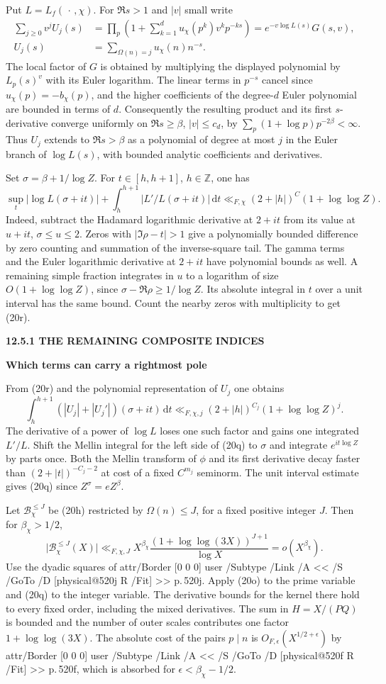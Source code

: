 \documentclass[11pt,letterpaper]{article}
\makeatletter
\newcommand{\rightmarktext}{}
\newcommand{\printfolio}{}
\newcommand{\leaf}[4]{\clearpage\gdef\printfolio{#1}\gdef\rightmarktext{#2}%
  {\small\sffamily\bfseries\color{ink}#3\par}\vspace{3pt}%
  {\LARGE\bfseries #4\par}\vspace{5pt}}
\newcommand{\Z}{\mathbb Z}
\newcommand{\dd}{\,\mathrm d}
\newcommand{\MusicPDFPageRef}[1]{\pdfpageref\csname physical@#1\endcsname\space\space 0 R}
\newcommand{\pagelink}[2]{\leavevmode\pdfstartlink attr{/Border [0 0 0]} user{%
  /Subtype /Link /A << /S /GoTo /D [\MusicPDFPageRef{#1} /Fit] >>}%
  {\color{ink}#2}\pdfendlink}
\newcommand{\pg}[1]{\pagelink{#1}{p.\,#1}}
\makeatother
\begin{document}
Put $L=L_f(\,\cdot\,,\chi)$. For $\Re s>1$ and $|v|$ small write
\[
 \begin{split}
  \sum_{j\ge0}v^j U_j(s)
   &=\prod_p\left(1+\sum_{k=1}^d u_\chi(p^k)v^k p^{-ks}\right)
     =e^{-v\log L(s)}G(s,v),\\
  U_j(s)&=\sum_{\Omega(n)=j} u_\chi(n)n^{-s}.
 \end{split}
\]
The local factor of $G$ is obtained by multiplying the displayed
polynomial by $L_p(s)^v$ with its Euler logarithm. The linear terms in
$p^{-s}$ cancel since $u_\chi(p)=-b_\chi(p)$, and the higher coefficients
of the degree-$d$ Euler polynomial are bounded in terms of $d$.
Consequently the resulting product and its first $s$-derivative converge
uniformly on $\Re s\ge\beta$, $|v|\le c_d$, by
$\sum_p(1+\log p)p^{-2\beta}<\infty$. Thus $U_j$ extends to
$\Re s>\beta$ as a polynomial of degree at most $j$ in the Euler branch
of $\log L(s)$, with bounded analytic coefficients and derivatives.

Set $\sigma=\beta+1/\log Z$. For $t\in[h,h+1]$, $h\in\Z$, one has
\[
 \sup_t|\log L(\sigma+it)|
  +\int_h^{h+1}|L'/L(\sigma+it)|\dd t
       \ll_{F,\chi}(2+|h|)^C(1+\log\log Z).
 \tag{20r}
\]
Indeed, subtract the Hadamard logarithmic derivative at $2+it$ from
its value at $u+it$, $\sigma\le u\le2$. Zeros with
$|\Im\rho-t|>1$ give a polynomially bounded difference by zero
counting and summation of the inverse-square tail. The gamma terms
and the Euler logarithmic derivative at $2+it$ have polynomial bounds
as well. A remaining simple fraction integrates in $u$ to a logarithm
of size $O(1+\log\log Z)$, since $\sigma-\Re\rho\ge1/\log Z$.
Its absolute integral in $t$ over a unit interval has the same bound.
Count the nearby zeros with multiplicity to get (20r).

\leaf{520m}{A fixed number of prime factors}{12.5.1 \quad THE REMAINING COMPOSITE INDICES}{Which terms can carry a rightmost pole}
From (20r) and the polynomial representation of $U_j$ one obtains
\[
  \int_h^{h+1}(|U_j|+|U_j'|)(\sigma+it)\dd t
       \ll_{F,\chi,j}(2+|h|)^{C_j}(1+\log\log Z)^j .
\]
The derivative of a power of $\log L$ loses one such factor and gains
one integrated $L'/L$. Shift the Mellin integral for the left side of
(20q) to $\sigma$ and integrate $e^{it\log Z}$ by parts once. Both the
Mellin transform of $\phi$ and its first derivative decay faster than
$(2+|t|)^{-C_j-2}$ at cost of a fixed $C^{m_j}$ seminorm. The unit
interval estimate gives (20q) since $Z^\sigma=eZ^\beta$.

Let $\mathcal B_\chi^{\le J}$ be (20h) restricted by $\Omega(n)\le J$,
for a fixed positive integer $J$. Then for $\beta_\chi>1/2$,
\[
   \big|\mathcal B_\chi^{\le J}(X)\big|\ll_{F,\chi,J}
      X^{\beta_\chi}\frac{(1+\log\log(3X))^{J+1}}{\log X}
          =o(X^{\beta_\chi}).
 \tag{20s}
\]
Use the dyadic squares of \pg{520j}. Apply (20o) to the prime variable
and (20q) to the integer variable. The derivative bounds for the
kernel there hold to every fixed order, including the mixed
derivatives. The sum in $H=X/(PQ)$ is bounded and the number of outer
scales contributes one factor $1+\log\log(3X)$. The absolute cost of
the pairs $p\mid n$ is $O_{F,\epsilon}(X^{1/2+\epsilon})$ by
\pg{520f}, which is absorbed for $\epsilon<\beta_\chi-1/2$.
\end{document}

